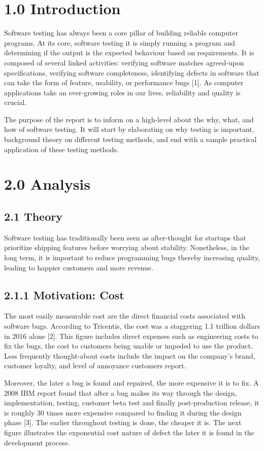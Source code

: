 \documentclass[12pt]{report}
\begin{document}
\section*{1.0 Introduction}
\par\indent
Software testing has always been a core pillar of building reliable computer programs. At its core, software testing it is simply running a program and determining if the output is the expected behaviour based on requirements. It is composed of several linked activities: verifying software matches agreed-upon specifications, verifying software completeness, identifying defects in software that can take the form of feature, usability, or performance bugs [1]. As computer applications take an ever-growing roles in our lives, reliability and quality is crucial. \\ \par\noindent
The purpose of the report is to inform on a high-level about the why, what, and how of software testing. It will start by elaborating on why testing is important, background theory on different testing methods, and end with a sample practical application of these testing methods.

\newpage\thispagestyle{fancy}\sectionfont{\scshape}
\section*{2.0 Analysis}
\subsection*{2.1 Theory}
\noindent
Software testing has traditionally been seen as after-thought for startups that prioritize shipping features before worrying about stability. Nonetheless, in the long term, it is important to reduce programming bugs thereby increasing quality, leading to happier customers and more revenue. 
\subsection*{2.1.1 Motivation: Cost}
\par\indent
The most easily measurable cost are the direct financial costs associated with software bugs. According to Tricentis, the cost was a staggering 1.1 trillion dollars in 2016 alone [2]. This figure includes direct expenses such as engineering costs to fix the bugs, the cost to customers being unable or impeded to use the product. Less frequently thought-about costs include the impact on the company's brand, customer loyalty, and level of annoyance customers report.
\par\noindent
Moreover, the later a bug is found and repaired, the more expensive it is to fix. A 2008 IBM report found that after a bug makes its way through the design, implementation, testing, customer beta test and finally post-production release, it is roughly 30 times more expensive compared to finding it during the design phase [3]. The earlier throughout testing is done, the cheaper it is. The next figure illustrates the exponential cost nature of defect the later it is found in the development process. 
\end{document}
